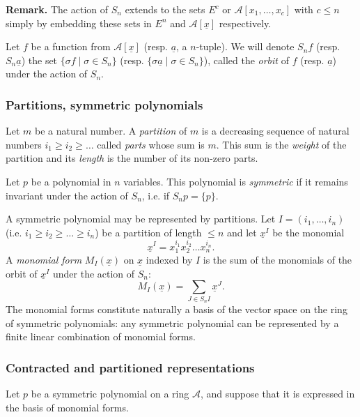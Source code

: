 \documentclass[11pt]{article}
\begin{document}
\textbf{Remark.} The action of $S_n$ extends to the sets $E^c$ or
$\mathcal{A}[x_1,\ldots ,x_c]$ with $c \leq n$ simply by embedding these sets in
$E^n$ and $\mathcal{A}[\underline x]$ respectively.

Let $f$ be a function from $\mathcal{A}[\underline x]$ (resp. $\underline a$, a
$n$-tuple).  We will denote $S_nf$ (resp. $S_n \underline a$) the set $\{\sigma
f \;|\; \sigma \in S_n \}$ (resp. $\{\sigma\underline a \;|\; \sigma \in S_n
\}$), called the \textit{orbit} of $f$ (resp. $\underline a$) under the action
of $S_n$.


\subsubsection{Partitions, symmetric polynomials}

Let $m$ be a natural number.  A \textit{partition} of $m$ is a decreasing
sequence of natural numbers $i_1\geq i_2 \geq \ldots$ called \textit{parts}
whose sum is $m$. This sum is the \textit{weight} of the partition and its
\textit{length} is the number of its non-zero parts.

Let $p$ be a polynomial in $n$ variables.  This polynomial is \textit{symmetric}
if it remains invariant under the action of $S_n$, i.e. if $S_n p =\{p\}$.

A symmetric polynomial may be represented by partitions.  Let $I=(i_1,\ldots,
i_n)$ (i.e. $i_1\geq i_2\geq \ldots \geq i_n$) be a partition of length $\le n$
and let ${\underline x}^I$ be the monomial
\begin{equation*}
  {\underline x}^I = x_1^{i_1}x_2^{i_2}\ldots x_n^{i_n}.
\end{equation*}
A \textit{monomial form} $M_I({\underline x})$ on ${\underline x}$ indexed by
$I$ is the sum of the monomials of the orbit of ${\underline x}^I$ under the
action of $S_n$:
\begin{equation*}
  M_I({\underline x}) =\sum_{J \in S_nI}{\underline x}^J.
\end{equation*}
The monomial forms constitute naturally a basis of the vector space on the ring
of symmetric polynomials: any symmetric polynomial can be represented by a
finite linear combination of monomial forms.


\subsubsection{Contracted and partitioned representations}

Let $p$ be a symmetric polynomial on a ring $\mathcal{A}$, and suppose that it
is expressed in the basis of monomial forms.
\end{document}
